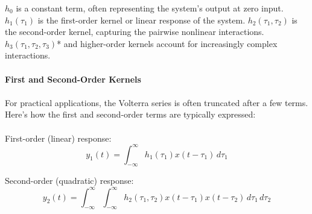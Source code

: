 \documentclass[12pt]{article}
\begin{document}
\noindent \( h_0 \) is a constant term, often representing the system's output at zero input.
\( h_1(\tau_1) \) is the first-order kernel or linear response of the system.
\( h_2(\tau_1, \tau_2) \) is the second-order kernel, capturing the pairwise nonlinear interactions.
\( h_3(\tau_1, \tau_2, \tau_3) \)* and higher-order kernels account for increasingly complex interactions.\\
\\
\textbf{First and Second-Order Kernels}\\
\\
For practical applications, the Volterra series is often truncated after a few terms.
Here's how the first and second-order terms are typically expressed:\\
\\
First-order (linear) response:\\
\begin{equation}
   y_1(t) = \int_{-\infty}^\infty h_1(\tau_1) x(t-\tau_1) \, d\tau_1
\end{equation}

Second-order (quadratic) response:\\
\begin{equation}
    y_2(t) = \int_{-\infty}^\infty \int_{-\infty}^\infty h_2(\tau_1, \tau_2) x(t-\tau_1) x(t-\tau_2) \, d\tau_1 \, d\tau_2
\end{equation}
\\
\end{document}
